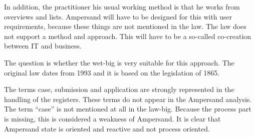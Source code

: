 {In addition, the practitioner his usual working method is that he works from overviews and lists. 
Ampersand will have to be designed for this with user requirements, because these things are not mentioned in the law. 
The law does not support a method and approach. 
This will have to be a so-called co-creation between IT and business.}

{The question is whether the wet-big is very suitable for this approach. 
The original law dates from 1993 and it is based on the legislation of 1865.}

{The terms case, submission and application are strongly represented in the handling of the registers. 
These terms do not appear in the Ampersand analysis. The term “case” is not mentioned at all in the law-big.
Because the process part is missing, this is considered a weakness of Ampersand. 
It is clear that Ampersand state is oriented and reactive and not process oriented.}